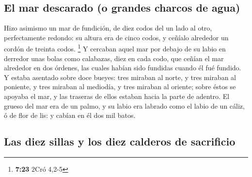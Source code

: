 \hypertarget{el-mar-descarado-o-grandes-charcos-de-agua}{%
\subsection{El mar descarado (o grandes charcos de
agua)}\label{el-mar-descarado-o-grandes-charcos-de-agua}}

 Hizo asimismo un mar de fundición, de diez codos del un
lado al otro, perfectamente redondo: su altura era de cinco codos, y
ceñíalo alrededor un cordón de treinta codos. \footnote{\textbf{7:23}
  2Cró 4,2-5}  Y cercaban aquel mar por debajo de su labio
en derredor unas bolas como calabazas, diez en cada codo, que ceñían el
mar alrededor en dos órdenes, las cuales habían sido fundidas cuando él
fué fundido.  Y estaba asentado sobre doce bueyes: tres
miraban al norte, y tres miraban al poniente, y tres miraban al
mediodía, y tres miraban al oriente; sobre éstos se apoyaba el mar, y
las traseras de ellos estaban hacia la parte de adentro. 
El grueso del mar era de un palmo, y su labio era labrado como el labio
de un cáliz, ó de flor de lis: y cabían en él dos mil batos.

\hypertarget{las-diez-sillas-y-los-diez-calderos-de-sacrificio}{%
\subsection{Las diez sillas y los diez calderos de
sacrificio}\label{las-diez-sillas-y-los-diez-calderos-de-sacrificio}}

